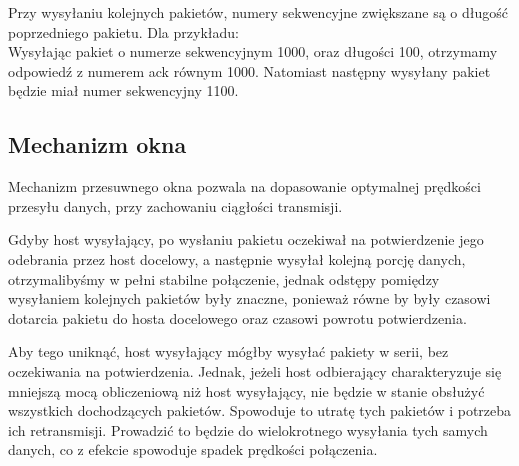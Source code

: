 \documentclass[a4paper,12pt,oneside]{book}
\begin{document}
			Przy wysyłaniu kolejnych pakietów, numery sekwencyjne zwiększane są o długość poprzedniego pakietu.
			Dla przykładu:\\
			Wysyłając pakiet o numerze sekwencyjnym 1000, oraz długości 100, otrzymamy odpowiedź z numerem ack równym 1000.
			Natomiast następny wysyłany pakiet będzie miał numer sekwencyjny 1100.
		\subsection{Mechanizm okna}
			Mechanizm przesuwnego okna pozwala na dopasowanie optymalnej prędkości przesyłu danych, przy zachowaniu ciągłości transmisji.

			Gdyby host wysyłający, po wysłaniu pakietu oczekiwał na potwierdzenie jego odebrania przez host docelowy, a następnie wysyłał kolejną porcję danych, otrzymalibyśmy w pełni stabilne połączenie, jednak odstępy pomiędzy wysyłaniem kolejnych pakietów były znaczne, ponieważ równe by były czasowi dotarcia pakietu do hosta docelowego oraz czasowi powrotu potwierdzenia.

			Aby tego uniknąć, host wysyłający mógłby wysyłać pakiety w serii, bez oczekiwania na potwierdzenia.
			Jednak, jeżeli host odbierający charakteryzuje się mniejszą mocą obliczeniową niż host wysyłający, nie będzie w stanie obsłużyć wszystkich dochodzących pakietów.
			Spowoduje to utratę tych pakietów i potrzeba ich retransmisji.
			Prowadzić to będzie do wielokrotnego wysyłania tych samych danych, co z efekcie spowoduje spadek prędkości połączenia.
		
\end{document}
